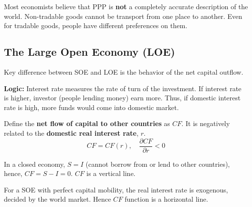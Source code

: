 \documentclass[12pt]{article}
\begin{document}
Most economists believe that PPP is {\textbf {not}} a completely accurate description
of the world. Non-tradable goods cannot be transport from one place to another. Even
for tradable goods, people have different preferences on them.








\subsection{The Large Open Economy (LOE)}

Key difference between SOE and LOE is the behavior of the net capital outflow.

{\textbf {Logic:}} Interest rate measures the rate of turn of the investment. If
interest rate is higher, investor (people lending money) earn more. Thus, if domestic
interest rate is high, more funds would come into domestic market. 

Define the {\textbf {net flow of capital to other countries}} as $ CF $. It is 
negatively related to the {\textbf {domestic real interest rate}}, $ r $.
\begin{equation*}
CF = CF(r), \quad \frac{\partial CF }{\partial r } < 0
\end{equation*}

\begin{figure}[H]
\end{figure}

In a closed economy, $ S = I $ (cannot borrow from or lend to other countries), hence,
$ CF = S - I = 0 $. $ CF $ is a vertical line.

For a SOE with perfect capital mobility, the real interest rate is exogenous, 
decided by the world market. Hence $ CF $ function is a horizontal line.
\end{document}
